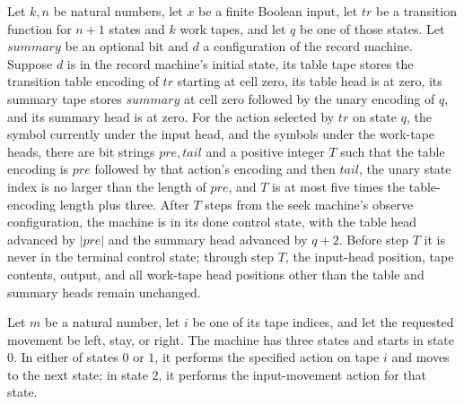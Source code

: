 \begin{lemma}
\label{Turing.StepBlock.seekTM_select}
\leanok
{}
Let $k,n$ be natural numbers, let $x$ be a finite Boolean input, let $tr$ be a
transition function for $n+1$ states and $k$ work tapes, and let $q$ be one of those
states. Let $summary$ be an optional bit and $d$ a configuration of the record machine.
Suppose $d$ is in the record machine's initial state, its table tape stores the
transition table encoding of $tr$ starting at cell zero, its table head is at zero, its
summary tape stores $summary$ at cell zero followed by the unary encoding of $q$, and
its summary head is at zero. For the action selected by $tr$ on state $q$, the symbol
currently under the input head, and the symbols under the work-tape heads, there are bit
strings $pre,tail$ and a positive integer $T$ such that the table encoding is $pre$
followed by that action's encoding and then $tail$, the unary state index is no larger
than the length of $pre$, and $T$ is at most five times the table-encoding length plus
three. After $T$ steps from the seek machine's observe configuration, the machine is in
its done control state, with the table head advanced by $|pre|$ and the summary head
advanced by $q+2$. Before step $T$ it is never in the terminal control state; through
step $T$, the input-head position, tape contents, output, and all work-tape head
positions other than the table and summary heads remain unchanged.
\end{lemma}

\begin{definition}
\label{Turing.StepBlock.twoMoveTM}
\leanok
{}
Let $m$ be a natural number, let $i$ be one of its tape indices, and let the requested
movement be left, stay, or right. The machine has three states and starts in state $0$.
In either of states $0$ or $1$, it performs the specified action on tape $i$ and moves
to the next state; in state $2$, it performs the input-movement action for that state.
\end{definition}

